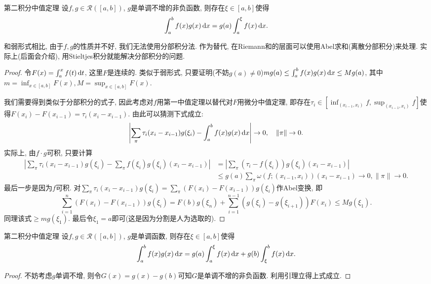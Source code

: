 \begin{lemma}{第二积分中值定理}
	设$f,g \in \mathcal{R}([a,b])$, $g$是单调不增的非负函数, 则存在$\xi \in [a,b]$使得$$\int_a^b f(x) g(x) \mathop{}\!\mathrm{d} x = g(a) \int_a^{\xi} f(x) \mathop{}\!\mathrm{d} x.$$
\end{lemma}
\begin{remark}
	和弱形式相比, 由于$f,g$的性质并不好, 我们无法使用分部积分法. 作为替代, 在Riemann和的层面可以使用Abel求和(离散分部积分)来处理. 实际上(后面会介绍), 用Stieltjes积分就能解决分部积分的问题. 
\end{remark}
\begin{proof}
	令$F(x)=\int_a^x f(t)\mathop{}\!\mathrm{d} t$, 这里$F$是连续的. 类似于弱形式, 只要证明(不妨$g(a) \neq 0$)$mg(a) \leq \int_a^b f(x)g(x) \mathop{}\!\mathrm{d} x \leq Mg(a)$, 其中$m=\inf_{x \in [a,b]}F(x), M=\sup_{x \in [a,b]}F(x)$. 
	
	我们需要得到类似于分部积分的式子, 因此考虑对$f$用第一中值定理以替代对$F$用微分中值定理, 即存在$\tau _i \in [\inf_{(x_{i-1},x_i)}f,\sup_{(x_{i-1},x_i)}f]$使得$F(x_i)-F(x_{i-1}) = \tau _i (x_i-x_{i-1})$. 由此可以猜测下式成立: $$\left| \sum_{\pi} \tau _i (x_i-x_{i-1}) g(\xi _i) - \int_a^b f(x)g(x) \mathop{}\!\mathrm{d} x \right| \to 0,\quad \| \pi \| \to 0.$$
	实际上, 由$f\cdot g$可积, 只要计算
	\begin{align*}
		\left| \sum_{\pi} \tau _i (x_i-x_{i-1}) g(\xi _i) - \sum_{\pi} f(\xi _i)g(\xi _i)(x_i-x_{i-1}) \right| &= \left| \sum_{\pi} (\tau _i-f(\xi _i))g(\xi _i)(x_i-x_{i-1})  \right| \\
		&\leq  g(a) \sum_{\pi} \omega (f;(x_{i-1},x_i))(x_i-x_{i-1})  \to 0, \| \pi \| \to 0.
	\end{align*}
	最后一步是因为$f$可积. 对$\sum_{\pi} \tau _i (x_i-x_{i-1}) g(\xi _i) = \sum_{\pi} (F(x_i)-F(x_{i-1})) g(\xi _i)$作Abel变换, 即$$\sum_{i=1}^n (F(x_i)-F(x_{i-1})) g(\xi _i) = F(b)g(\xi _n) + \sum_{i=1}^{n-1} (g(\xi _i)-g(\xi _{i+1})) F(x_i) \leq Mg(\xi _1).$$
	同理该式$\geq mg(\xi _1)$. 最后令$\xi _1=a$即可(这是因为分割是人为选取的). 
\end{proof}



\begin{theorem}{第二积分中值定理}
	设$f,g \in \mathcal{R}([a,b])$, $g$是单调函数, 则存在$\xi \in [a,b]$使得$$\int_a^b f(x) g(x) \mathop{}\!\mathrm{d} x = g(a) \int_a^{\xi} f(x) \mathop{}\!\mathrm{d} x + g(b) \int_{\xi}^{b} f(x) \mathop{}\!\mathrm{d} x.$$
\end{theorem}
\begin{proof}
	不妨考虑$g$单调不增, 则令$G(x)=g(x)-g(b)$可知$G$是单调不增的非负函数. 利用引理立得上式成立. 
\end{proof}


